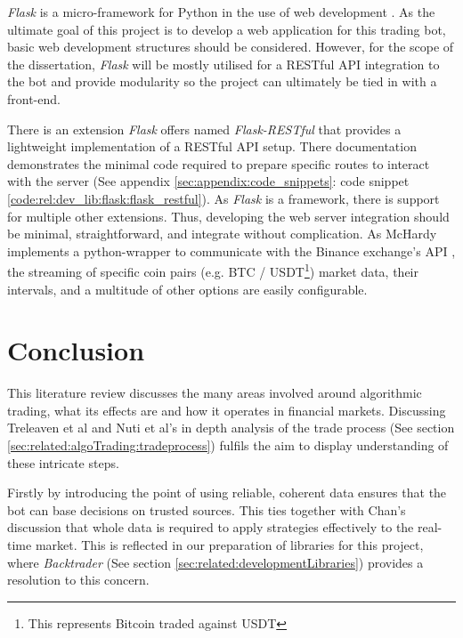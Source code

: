 \textit{Flask} is a micro-framework for Python in the use of web development \cite{MISC:FLASK}. As the ultimate goal of this project is to develop a web application for this trading bot, basic web development structures should be considered. However, for the scope of the dissertation, \textit{Flask} will be mostly utilised for a RESTful API integration to the bot and provide modularity so the project can ultimately be tied in with a front-end. 

There is an extension \textit{Flask} offers named \textit{Flask-RESTful} that provides a lightweight implementation of a RESTful API setup. There documentation demonstrates the minimal code required to prepare specific routes to interact with the server (See appendix \ref{sec:appendix:code_snippets}: code snippet \ref{code:rel:dev_lib:flask:flask_restful}). As \textit{Flask} is a framework, there is support for multiple other extensions. Thus, developing the web server integration should be minimal, straightforward, and integrate without complication. As McHardy \cite{MISC:Python-Binance} implements a python-wrapper to communicate with the Binance exchange's API \cite{WEB:BINANCE_API:2018}, the streaming of specific coin pairs (e.g. BTC / USDT\footnote{This represents Bitcoin traded against USDT}) market data, their intervals, and a multitude of other options are easily configurable.  



\newpage
\section{Conclusion}
\label{sec:related:conclusion}

This literature review discusses the many areas involved around algorithmic trading, what its effects are and how it operates in financial markets. Discussing Treleaven et al \cite{ART:Treleaven:2013} and Nuti et al's \cite{ART:Nuti:2011} in depth analysis of the trade process (See section \ref{sec:related:algoTrading:tradeprocess}) fulfils the aim to display understanding of these intricate steps. 

Firstly by introducing the point of using reliable, coherent data ensures that the bot can base decisions on trusted sources. This ties together with Chan's \cite{BOOK:Chan:2013} discussion that whole data is required to apply strategies effectively to the real-time market. This is reflected in our preparation of libraries for this project, where \textit{Backtrader} (See section \ref{sec:related:developmentLibraries}) provides a resolution to this concern.



